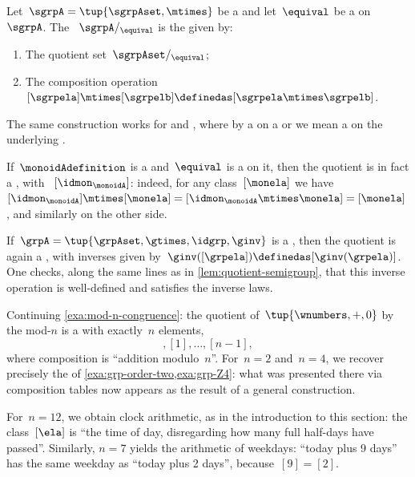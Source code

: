 \begin{ctdefinition}
    \label{def:quotient-semigroup}
    Let~$\sgrpA = \tup{\sgrpAset, \mtimes}$ be a  and let~$\equival$ be a  on~$\sgrpA$.
    The ~$\sgrpA/_{\equival}$ is the  given by:

    \constit

    \begin{enumerate}
        \item The quotient set~$\sgrpAset/_{\equival}$;
        \item The composition operation~$[\sgrpela] \mtimes [\sgrpelb] \definedas [\sgrpela \mtimes \sgrpelb]$.
    \end{enumerate}
\end{ctdefinition}

\begin{remark}
    \label{rem:quotient-monoid-group}
    The same construction works for  and , where by a  on a  or  we mean a  on the underlying .

    If~$\monoidAdefinition$ is a  and~$\equival$ is a  on it, then the quotient  is in fact a , with ~$[\idmon_\monoidA]$: indeed, for any class~$[\monela]$ we have~$[\idmon_\monoidA] \mtimes [\monela] = [\idmon_\monoidA \mtimes \monela] = [\monela]$, and similarly on the other side.

    If~$\grpA = \tup{\grpAset, \gtimes, \idgrp, \ginv}$ is a , then the quotient is again a , with inverses given by~$\ginv([\grpela]) \definedas [\ginv(\grpela)]$.
    One checks, along the same lines as in \cref{lem:quotient-semigroup}, that this inverse operation is well-defined and satisfies the inverse laws.
\end{remark}

\begin{example}
    \label{exa:clock-arithmetic-quotient}
    Continuing \cref{exa:mod-n-congruence}: the quotient of~$\tup{\wnumbers, +, 0}$ by the mod-$n$  is a  with exactly~$n$ elements,
    \begin{equation}
        [0], [1], \dots, [n-1],
    \end{equation}
    where composition is ``addition modulo~$n$''.
    For~$n = 2$ and~$n = 4$, we recover precisely the  of \cref{exa:grp-order-two,exa:grp-Z4}: what was presented there via composition tables now appears as the result of a general construction.

    For~$n = 12$, we obtain clock arithmetic, as in the introduction to this section: the class~$[\ela]$ is ``the time of day, disregarding how many full half-days have passed''.
    Similarly, $n = 7$ yields the arithmetic of weekdays: ``today plus 9 days'' has the same weekday as ``today plus 2 days'', because~$[9] = [2]$.
\end{example}

